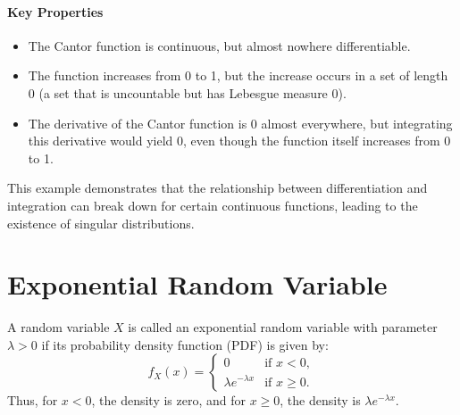     \paragraph{Key Properties}
    \begin{itemize}
        \item The Cantor function is continuous, but almost nowhere differentiable.
        \item The function increases from 0 to 1, but the increase occurs in a set of length 0 (a set that is uncountable but has Lebesgue measure 0).
        \item The derivative of the Cantor function is 0 almost everywhere, but integrating this derivative would yield 0, even though the function itself increases from 0 to 1.
    \end{itemize}
    This example demonstrates that the relationship between differentiation and integration can break down for certain continuous functions, leading to the existence of singular distributions.
    
    \section{Exponential Random Variable}
    A random variable $X$ is called an exponential random variable with parameter $\lambda > 0$ if its probability density function (PDF) is given by:
    \[
    f_X(x) = \begin{cases} 
    0 & \text{if } x < 0, \\
    \lambda e^{-\lambda x} & \text{if } x \geq 0.
    \end{cases}
    \]
    Thus, for $x < 0$, the density is zero, and for $x \geq 0$, the density is $\lambda e^{-\lambda x}$.
    
